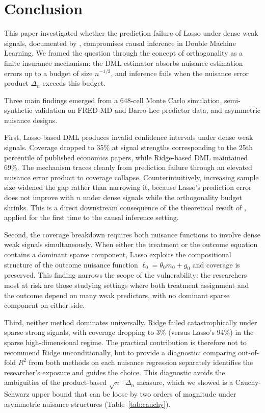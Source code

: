 \documentclass[a4paper,10.5pt]{article}
\begin{document}
\section{Conclusion}\label{sec:conclusion}

This paper investigated whether the prediction failure of Lasso under dense weak signals, documented by \citet{shenxiu2025}, compromises causal inference in Double Machine Learning. We framed the question through the concept of orthogonality as a finite insurance mechanism: the DML estimator absorbs nuisance estimation errors up to a budget of size $n^{-1/2}$, and inference fails when the nuisance error product $\Delta_n$ exceeds this budget.

Three main findings emerged from a 648-cell Monte Carlo simulation, semi-synthetic validation on FRED-MD and Barro-Lee predictor data, and asymmetric nuisance designs.

First, Lasso-based DML produces invalid confidence intervals under dense weak signals. Coverage dropped to 35\% at signal strengths corresponding to the 25th percentile of published economics papers, while Ridge-based DML maintained 69\%. The mechanism traces cleanly from prediction failure through an elevated nuisance error product to coverage collapse. Counterintuitively, increasing sample size widened the gap rather than narrowing it, because Lasso's prediction error does not improve with $n$ under dense signals while the orthogonality budget shrinks. This is a direct downstream consequence of the theoretical result of \citet{shenxiu2025}, applied for the first time to the causal inference setting.

Second, the coverage breakdown requires both nuisance functions to involve dense weak signals simultaneously. When either the treatment or the outcome equation contains a dominant sparse component, Lasso exploits the compositional structure of the outcome nuisance function $\ell_0 = \theta_0 m_0 + g_0$ and coverage is preserved. This finding narrows the scope of the vulnerability: the researchers most at risk are those studying settings where both treatment assignment and the outcome depend on many weak predictors, with no dominant sparse component on either side.

Third, neither method dominates universally. Ridge failed catastrophically under sparse strong signals, with coverage dropping to 3\% (versus Lasso's 94\%) in the sparse high-dimensional regime. The practical contribution is therefore not to recommend Ridge unconditionally, but to provide a diagnostic: comparing out-of-fold $R^2$ from both methods on each nuisance regression separately identifies the researcher's exposure and guides the choice. This diagnostic avoids the ambiguities of the product-based $\sqrt{n}\cdot\Delta_n$ measure, which we showed is a Cauchy-Schwarz upper bound that can be loose by two orders of magnitude under asymmetric nuisance structures (Table~\ref{tab:cauchy}).
\end{document}
